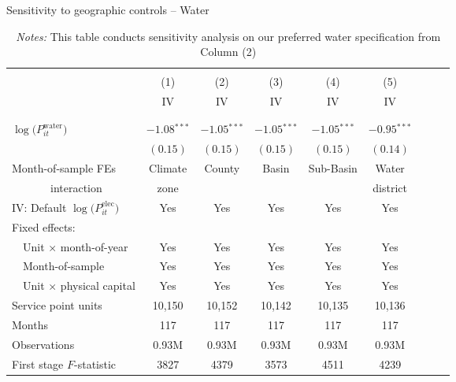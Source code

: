 \begin{table}[t!]\centering
\small
\caption{Sensitivity to geographic controls -- Water  \label{tab:water_regs_month_int_fes}}
\vspace{-0.1cm}
\small
\begin{adjustbox}{center} 
\begin{tabular}{lcccccccc} 
\hline \hline
\vspace{-0.37cm}
\\
 & (1)  & (2)  & (3)  & (4)  & (5)   \\ 
[0.1em]
 & IV & IV & IV & IV & IV  \\
\vspace{-0.37cm}
\\
\cline{2-6}
\vspace{-0.27cm}
\\
 $\log\big(P^{\text{water}}_{it}\big)$ ~ & $-1.08$$^{***}$  & $-1.05$$^{***}$ & $-1.05$$^{***}$ & $-1.05$$^{***}$ & $-0.95$$^{***}$ \\ 
& $(0.15)$ & $(0.15)$ & $(0.15)$ & $(0.15)$ & $(0.14)$  \\
[1.5em] 
Month-of-sample FEs & Climate & County & Basin  & Sub-Basin  &  Water  \\
~~~~~~~interaction & zone & & & & district \\ 
[1em] 
IV: Default $\log\big(P^{\text{elec}}_{it}\big)$  & Yes & Yes & Yes  & Yes  &  Yes \\
[1em] 
Fixed effects: \\
[0.1em] 
~~Unit $\times$ month-of-year  & Yes  & Yes  & Yes  & Yes  & Yes   \\ 
[0.1em] 
~~Month-of-sample  & Yes  & Yes  & Yes  & Yes  & Yes     \\ 
[0.1em] 
~~Unit $\times$ physical capital & Yes & Yes & Yes & Yes & Yes  \\
[1em] 
Service point units & 10,150 & 10,152 & 10,142 & 10,135 & 10,136   \\ 
[0.1em] 
Months  & 117 & 117 & 117 & 117 & 117  \\ 
[0.1em] 
Observations & 0.93M & 0.93M & 0.93M & 0.93M & 0.93M  \\ 
[0.1em] 
First stage $F$-statistic & 3827 & 4379 & 3573 & 4511 & 4239  \\ 
[0.15em]
\hline
\end{tabular}
\end{adjustbox}
\captionsetup{width=\textwidth}
\caption*{\scriptsize \emph{Notes:} This table conducts sensitivity analysis on our preferred water specification from Column (2) 
}
\end{table}
